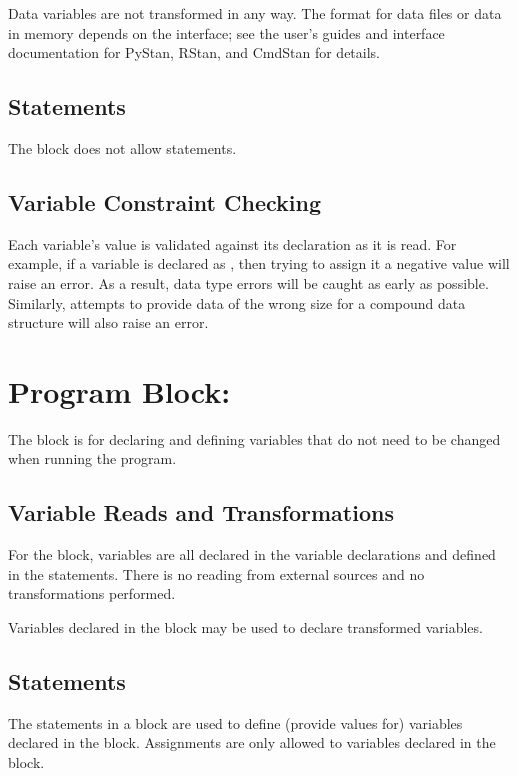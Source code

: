 Data variables are not transformed in any way.  The format for data
files or data in memory depends on the interface; see the user's
guides and interface documentation for PyStan, RStan, and CmdStan for details.

\subsection{Statements}

The  block does not allow statements.

\subsection{Variable Constraint Checking}

Each variable's value is validated against its declaration as it is
read.  For example, if a variable  is declared as
, then trying to assign it a negative value will raise
an error.  As a result, data type errors will be caught as early as
possible.  Similarly, attempts to provide data of the wrong size for a
compound data structure will also raise an error.


\section{Program Block: }

The  block is for declaring and defining
variables that do not need to be changed when running the program.  

\subsection{Variable Reads and Transformations}

For the  block, variables are all declared in
the variable declarations and defined in the statements.  There is no
reading from external sources and no transformations performed.

Variables declared in the  block may be used to declare
transformed variables.

\subsection{Statements}

The statements in a  block are used to define
(provide values for) variables declared in the 
block. Assignments are only allowed to variables declared in the
 block.

